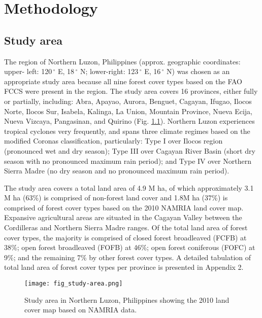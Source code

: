 
\chapter{Methodology}
\label{cha: methodology}

\section{Study area}
\label{sec: method-study-area}

The region of Northern Luzon, Philippines (approx. geographic coordinates: upper- left: 120$\,^{\circ}$ E, 18$\,^{\circ}$ N; lower-right: 123$\,^{\circ}$ E, 16$\,^{\circ}$ N) was chosen as an appropriate study area because all nine forest cover types based on the FAO FCCS were present in the region. The study area covers 16 provinces, either fully or partially, including: Abra, Apayao, Aurora, Benguet, Cagayan, Ifugao, Ilocos Norte, Ilocos Sur, Isabela, Kalinga, La Union, Mountain Province, Nueva Ecija, Nueva Vizcaya, Pangasinan, and Quirino (Fig. \ref{fig: method-fig3.1}). Northern Luzon experiences tropical cyclones very frequently, and spans three climate regimes based on the modified Coronas classification, particularly: Type I over Ilocos region (pronounced wet and dry season); Type III over Cagayan River Basin (short dry season with no pronounced maximum rain period); and Type IV over Northern Sierra Madre (no dry season and no pronounced maximum rain period).

The study area covers a total land area of 4.9 M ha, of which approximately 3.1 M ha (63\%) is comprised of non-forest land cover and 1.8M ha (37\%) is comprised of forest cover types based on the 2010 NAMRIA land cover map. Expansive agricultural areas are situated in the Cagayan Valley between the Cordilleras and Northern Sierra Madre ranges. Of the total land area of forest cover types, the majority is comprised of closed forest broadleaved (FCFB) at 38\%; open forest broadleaved (FOFB) at 46\%; open forest coniferous (FOFC) at 9\%; and the remaining 7\% by other forest cover types. A detailed tabulation of total land area of forest cover types per province is presented in Appendix 2.

\begin{figure}
	\centering
	\texttt{[image: fig\_study-area.png]}
	\caption[Study area in Northern Luzon, Philippines showing the 2010 land cover map based on NAMRIA data.]{Study area in Northern Luzon, Philippines showing the 2010 land cover map based on NAMRIA data.}
	\label{fig: method-fig3.1}
\end{figure}

